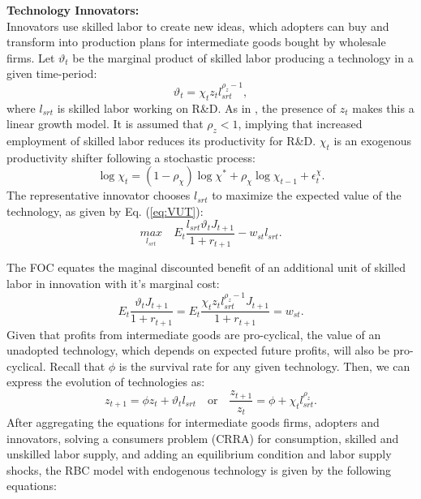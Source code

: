 \documentclass[compress,xcolor=dvipsnames]{beamer}
\begin{document}
\begin{frame}
\textbf{Technology Innovators:} \\ 
Innovators use skilled labor to create new ideas, which adopters can buy and transform into production plans for
intermediate goods bought by wholesale firms. Let $\vartheta_t$ be the marginal product of skilled labor producing a technology in a given time-period:
\begin{equation}
\vartheta_t = \chi_tz_tl_{srt}^{\rho_z-1},
\end{equation}
where $l_{srt}$ is skilled labor working on R\&D. As in \citet{romer1990endogenous}, the presence of $z_t$ makes this a linear growth model. It is assumed that $\rho_z<1$, implying that increased employment of skilled labor reduces its productivity for R\&D. $\chi_t$ is an exogenous productivity shifter following a stochastic process:
\begin{equation}
\log \chi_t = (1-\rho_\chi)\log \chi^* +\rho_\chi \log \chi_{t-1}+\epsilon_t^\chi.
\end{equation}
The representative innovator chooses $l_{srt}$ to maximize the expected value of the technology, as given by Eq. (\ref{eq:VUT}): 
\begin{equation}
\underset{l_{srt}}{max}\quad E_t\frac{l_{srt}\vartheta_t J_{t+1}}{1+r_{t+1}}-w_{st}l_{srt}.
\end{equation}
\end{frame}

\begin{frame}
The FOC equates the maginal discounted benefit of an additional unit of skilled labor in innovation with it's marginal cost:
\begin{equation}
E_t \frac{\vartheta_t J_{t+1}}{1+r_{t+1}}=E_t  \frac{\chi_tz_tl_{srt}^{\rho_z-1} J_{t+1}}{1+r_{t+1}}=w_{st}.
\end{equation}
Given that profits from intermediate goods are pro-cyclical, the value of an unadopted technology, which depends on expected future profits, will also be pro-cyclical. Recall that $\phi$ is the survival rate for any
given technology. Then, we can express the evolution of technologies as:
\begin{equation} \label{eq:RD}
z_{t+1}=\phi z_t+ \vartheta_t l_{srt}\quad \text{or}\quad \frac{z_{t+1}}{z_t}=\phi + \chi_tl_{srt}^{\rho_z}.
\end{equation}
After aggregating the equations for intermediate goods firms, adopters and innovators, solving a consumers problem (CRRA) for consumption, skilled and unskilled labor supply, and adding an equilibrium condition and labor supply shocks, the RBC model with endogenous technology is given by the following equations:
\end{frame}
\end{document}
